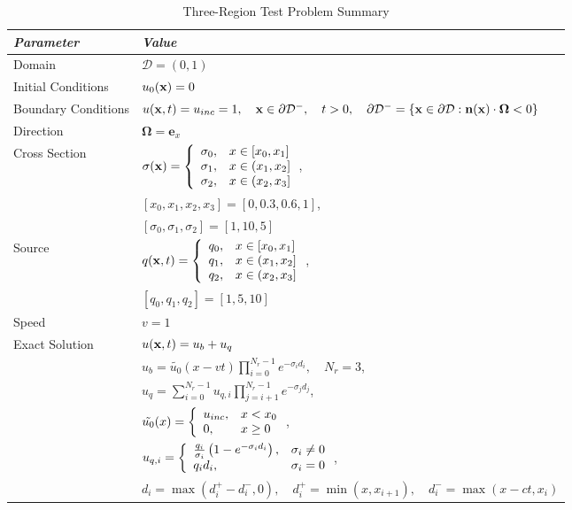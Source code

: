 \begin{table}[h]\caption{Three-Region Test Problem Summary}
\label{tab:three_region}
\centering
\begin{tabular}{l l}\toprule
\emph{Parameter} & \emph{Value}\\\midrule
Domain & $\mathcal{D} = (0,1)$\\
Initial Conditions & $u_0(\mathbf{x})=0$\\
Boundary Conditions & $u(\mathbf{x},t)=u_{inc}=1,\quad \mathbf{x}\in\partial\mathcal{D}^-,\quad t>0,
   \quad\partial\mathcal{D}^-=\{\mathbf{x}\in\partial\mathcal{D}:\mathbf{n}(\mathbf{x})
   \cdot\mathbf{\Omega}<0\}$\\
Direction & $\mathbf{\Omega} = \mathbf{e}_x$\\
Cross Section & $\sigma(\mathbf{x})=\left\{\begin{array}{c l}
   \sigma_0, & x\in[x_0,x_1]\\
   \sigma_1, & x\in(x_1,x_2]\\
   \sigma_2, & x\in(x_2,x_3]
   \end{array}\right.$,\\
   & $[x_0,x_1,x_2,x_3] = [0,0.3,0.6,1]$,\\
   & $[\sigma_0,\sigma_1,\sigma_2] = [1,10,5]$\\
Source & $q(\mathbf{x},t)=\left\{\begin{array}{c l}
   q_0, & x\in[x_0,x_1]\\
   q_1, & x\in(x_1,x_2]\\
   q_2, & x\in(x_2,x_3]
   \end{array}\right.$,\\
   & $[q_0,q_1,q_2] = [1,5,10]$\\
Speed & $v=1$\\
Exact Solution & $u(\mathbf{x},t) = u_b + u_q$\\
   & $u_b=\tilde{u_0}(x-vt)\prod\limits_{i=0}^{N_r-1}e^{-\sigma_i d_i},
        \quad N_r=3$,\\
   & $u_q=\sum\limits_{i=0}^{N_r-1}u_{q,i}\prod\limits_{j=i+1}^{N_r-1}
        e^{-\sigma_j d_j}$,\\
   & $\tilde{u_0}(x) = \left\{\begin{array}{l l}
        u_{inc}, & x<x_0\\
        0,       & x\geq 0
     \end{array}\right.$,\\
   & $u_{q,i} = \left\{\begin{array}{l l}
        \frac{q_i}{\sigma_i}\left(1-e^{-\sigma_i d_i}\right), & \sigma_i\neq 0\\
        q_i d_i, & \sigma_i = 0
        \end{array}\right.$,\\
   & $d_i = \max(d^+_i-d^-_i,0),\quad
     d^+_i = \min(x,x_{i+1}),\quad
     d^-_i = \max(x-ct,x_i)$ \\
\bottomrule\end{tabular}
\end{table}
